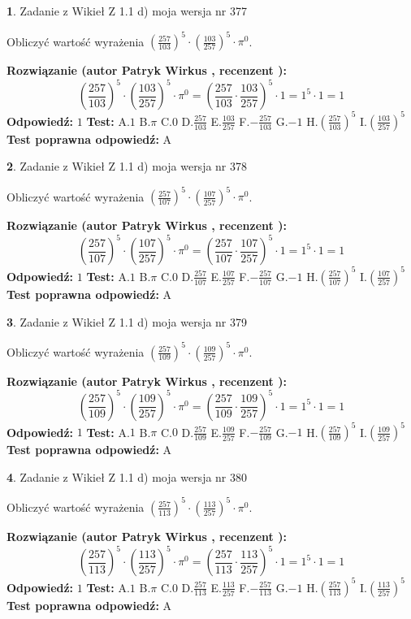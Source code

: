 \documentclass[12pt, a4paper]{article}
\theoremstyle{definition} %
\newtheorem{zad}{}
\newcommand{\zadStart}[1]{\begin{zad}#1\newline}
\newcommand{\zadStop}{\end{zad}}
\newcommand{\rozwStart}[2]{\noindent \textbf{Rozwiązanie (autor #1 , recenzent #2): }\newline}
\newcommand{\rozwStop}{\newline}
\newcommand{\odpStart}{\noindent \textbf{Odpowiedź:}\newline}
\newcommand{\odpStop}{\newline}
\newcommand{\testStart}{\noindent \textbf{Test:}\newline}
\newcommand{\testStop}{\newline}
\newcommand{\kluczStart}{\noindent \textbf{Test poprawna odpowiedź:}\newline}
\newcommand{\kluczStop}{\newline}
\begin{document}
\zadStart{Zadanie z Wikieł Z 1.1 d) moja wersja nr 377}

Obliczyć wartość wyrażenia $(\frac{257}{103})^{5} \cdot (\frac{103}{257})^{5} \cdot \pi^{0}$.
\zadStop
\rozwStart{Patryk Wirkus}{}
$$(\frac{257}{103})^{5} \cdot (\frac{103}{257})^{5} \cdot \pi^{0} = (\frac{257}{103} \cdot \frac{103}{257})^{5} \cdot 1 = 1^{5} \cdot 1 = 1$$
\rozwStop
\odpStart
$1$
\odpStop
\testStart
A.$1$ B.$\pi$ C.$0$ D.$\frac{257}{103}$ E.$\frac{103}{257}$
F.$-\frac{257}{103}$ G.$-1$
H.$(\frac{257}{103})^{5}$
I.$(\frac{103}{257})^{5}$
\testStop
\kluczStart
A
\kluczStop



\zadStart{Zadanie z Wikieł Z 1.1 d) moja wersja nr 378}

Obliczyć wartość wyrażenia $(\frac{257}{107})^{5} \cdot (\frac{107}{257})^{5} \cdot \pi^{0}$.
\zadStop
\rozwStart{Patryk Wirkus}{}
$$(\frac{257}{107})^{5} \cdot (\frac{107}{257})^{5} \cdot \pi^{0} = (\frac{257}{107} \cdot \frac{107}{257})^{5} \cdot 1 = 1^{5} \cdot 1 = 1$$
\rozwStop
\odpStart
$1$
\odpStop
\testStart
A.$1$ B.$\pi$ C.$0$ D.$\frac{257}{107}$ E.$\frac{107}{257}$
F.$-\frac{257}{107}$ G.$-1$
H.$(\frac{257}{107})^{5}$
I.$(\frac{107}{257})^{5}$
\testStop
\kluczStart
A
\kluczStop



\zadStart{Zadanie z Wikieł Z 1.1 d) moja wersja nr 379}

Obliczyć wartość wyrażenia $(\frac{257}{109})^{5} \cdot (\frac{109}{257})^{5} \cdot \pi^{0}$.
\zadStop
\rozwStart{Patryk Wirkus}{}
$$(\frac{257}{109})^{5} \cdot (\frac{109}{257})^{5} \cdot \pi^{0} = (\frac{257}{109} \cdot \frac{109}{257})^{5} \cdot 1 = 1^{5} \cdot 1 = 1$$
\rozwStop
\odpStart
$1$
\odpStop
\testStart
A.$1$ B.$\pi$ C.$0$ D.$\frac{257}{109}$ E.$\frac{109}{257}$
F.$-\frac{257}{109}$ G.$-1$
H.$(\frac{257}{109})^{5}$
I.$(\frac{109}{257})^{5}$
\testStop
\kluczStart
A
\kluczStop



\zadStart{Zadanie z Wikieł Z 1.1 d) moja wersja nr 380}

Obliczyć wartość wyrażenia $(\frac{257}{113})^{5} \cdot (\frac{113}{257})^{5} \cdot \pi^{0}$.
\zadStop
\rozwStart{Patryk Wirkus}{}
$$(\frac{257}{113})^{5} \cdot (\frac{113}{257})^{5} \cdot \pi^{0} = (\frac{257}{113} \cdot \frac{113}{257})^{5} \cdot 1 = 1^{5} \cdot 1 = 1$$
\rozwStop
\odpStart
$1$
\odpStop
\testStart
A.$1$ B.$\pi$ C.$0$ D.$\frac{257}{113}$ E.$\frac{113}{257}$
F.$-\frac{257}{113}$ G.$-1$
H.$(\frac{257}{113})^{5}$
I.$(\frac{113}{257})^{5}$
\testStop
\kluczStart
A
\kluczStop
\end{document}
